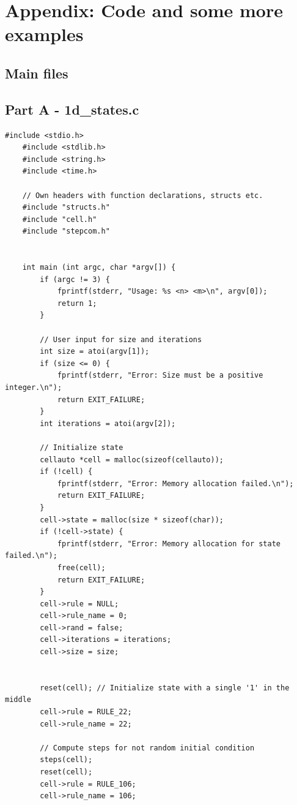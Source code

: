 \documentclass[12pt,a4paper]{article}
\begin{document}
\newpage


\section{Appendix: Code and some more examples}

\subsection{Main files}

\subsection*{\small Part A - 1d\_states.c}
\begin{lstlisting}[caption={\small 1d\_states.c},label={lst:p7001},basicstyle=\ttfamily\tiny]
    #include <stdio.h>
    #include <stdlib.h>
    #include <string.h>
    #include <time.h>

    // Own headers with function declarations, structs etc. 
    #include "structs.h"
    #include "cell.h"
    #include "stepcom.h"


    int main (int argc, char *argv[]) {
        if (argc != 3) {
            fprintf(stderr, "Usage: %s <n> <m>\n", argv[0]);
            return 1;
        }

        // User input for size and iterations
        int size = atoi(argv[1]);
        if (size <= 0) {
            fprintf(stderr, "Error: Size must be a positive integer.\n");
            return EXIT_FAILURE;
        }
        int iterations = atoi(argv[2]);

        // Initialize state
        cellauto *cell = malloc(sizeof(cellauto));
        if (!cell) {
            fprintf(stderr, "Error: Memory allocation failed.\n");
            return EXIT_FAILURE;
        }
        cell->state = malloc(size * sizeof(char));
        if (!cell->state) {
            fprintf(stderr, "Error: Memory allocation for state failed.\n");
            free(cell);
            return EXIT_FAILURE;
        }
        cell->rule = NULL; 
        cell->rule_name = 0;
        cell->rand = false;
        cell->iterations = iterations;
        cell->size = size;


        reset(cell); // Initialize state with a single '1' in the middle
        cell->rule = RULE_22;
        cell->rule_name = 22;

        // Compute steps for not random initial condition
        steps(cell);
        reset(cell); 
        cell->rule = RULE_106;
        cell->rule_name = 106;


\end{lstlisting}
\end{document}
